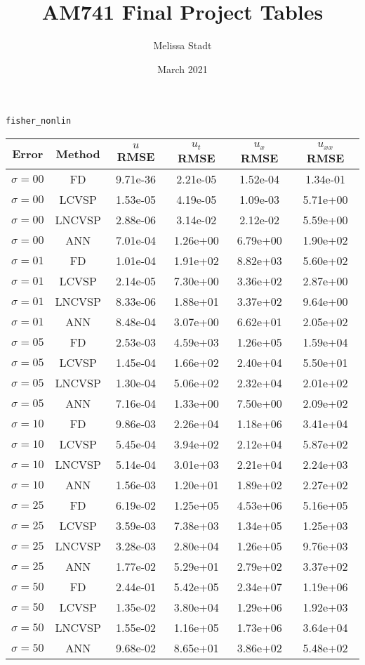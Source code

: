 \documentclass{article}
\title{AM741 Final Project Tables}
\author{Melissa Stadt}
\date{March 2021}
\begin{document}
\verb+fisher_nonlin+
\begin{tabular}{cccccc}
    Error & Method & $u$ RMSE & $u_{t}$ RMSE & $u_{x}$ RMSE & $u_{xx}$ RMSE \\ 
    \hline
    $\sigma = 00$ & FD & 9.71e-36 & 2.21e-05 & 1.52e-04 & 1.34e-01 \\
    $\sigma = 00$ & LCVSP & 1.53e-05 & 4.19e-05 & 1.09e-03 & 5.71e+00 \\
    $\sigma = 00$ & LNCVSP & 2.88e-06 & 3.14e-02 & 2.12e-02 & 5.59e+00 \\
    $\sigma = 00$ & ANN & 7.01e-04 & 1.26e+00 & 6.79e+00 & 1.90e+02 \\
    \hline
    $\sigma = 01$ & FD & 1.01e-04 & 1.91e+02 & 8.82e+03 & 5.60e+02 \\
    $\sigma = 01$ & LCVSP & 2.14e-05 & 7.30e+00 & 3.36e+02 & 2.87e+00 \\
    $\sigma = 01$ & LNCVSP & 8.33e-06 & 1.88e+01 & 3.37e+02 & 9.64e+00 \\
    $\sigma = 01$ & ANN & 8.48e-04 & 3.07e+00 & 6.62e+01 & 2.05e+02 \\
    \hline
    $\sigma = 05$ & FD & 2.53e-03 & 4.59e+03 & 1.26e+05 & 1.59e+04 \\
    $\sigma = 05$ & LCVSP & 1.45e-04 & 1.66e+02 & 2.40e+04 & 5.50e+01 \\
    $\sigma = 05$ & LNCVSP & 1.30e-04 & 5.06e+02 & 2.32e+04 & 2.01e+02 \\
    $\sigma = 05$ & ANN & 7.16e-04 & 1.33e+00 & 7.50e+00 & 2.09e+02 \\
    \hline
    $\sigma = 10$ & FD & 9.86e-03 & 2.26e+04 & 1.18e+06 & 3.41e+04 \\
    $\sigma = 10$ & LCVSP & 5.45e-04 & 3.94e+02 & 2.12e+04 & 5.87e+02 \\
    $\sigma = 10$ & LNCVSP & 5.14e-04 & 3.01e+03 & 2.21e+04 & 2.24e+03 \\
    $\sigma = 10$ & ANN & 1.56e-03 & 1.20e+01 & 1.89e+02 & 2.27e+02 \\
    \hline
    $\sigma = 25$ & FD & 6.19e-02 & 1.25e+05 & 4.53e+06 & 5.16e+05 \\
    $\sigma = 25$ & LCVSP & 3.59e-03 & 7.38e+03 & 1.34e+05 & 1.25e+03 \\
    $\sigma = 25$ & LNCVSP & 3.28e-03 & 2.80e+04 & 1.26e+05 & 9.76e+03 \\
    $\sigma = 25$ & ANN & 1.77e-02 & 5.29e+01 & 2.79e+02 & 3.37e+02 \\
    \hline
    $\sigma = 50$ & FD & 2.44e-01 & 5.42e+05 & 2.34e+07 & 1.19e+06 \\
    $\sigma = 50$ & LCVSP & 1.35e-02 & 3.80e+04 & 1.29e+06 & 1.92e+03 \\
    $\sigma = 50$ & LNCVSP & 1.55e-02 & 1.16e+05 & 1.73e+06 & 3.64e+04 \\
    $\sigma = 50$ & ANN & 9.68e-02 & 8.65e+01 & 3.86e+02 & 5.48e+02 \\
    \hline
\end{tabular}
\end{document}

